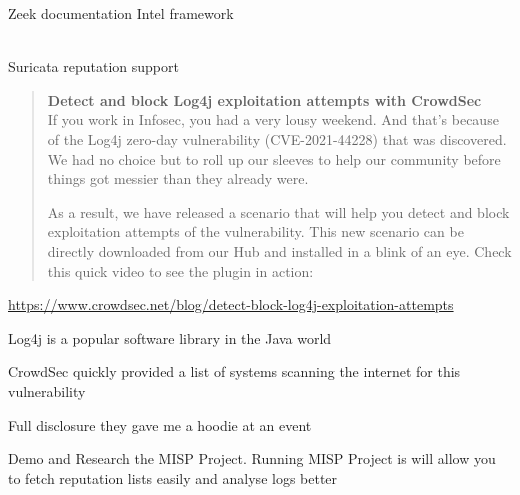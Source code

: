 \documentclass[Screen16to9,17pt]{foils}
\begin{document}

\begin{list1}
\item Zeek documentation Intel framework\\
\\
\item Suricata reputation support\\
\end{list1}





\begin{quote}
{\bf Detect and block Log4j exploitation attempts with CrowdSec}\\
If you work in Infosec, you had a very lousy weekend. And that’s because of the Log4j zero-day vulnerability (CVE-2021-44228) that was discovered. We had no choice but to roll up our sleeves to help our community before things got messier than they already were.

As a result, we have released a scenario that will help you detect and block exploitation attempts of the vulnerability. This new scenario can be directly downloaded from our Hub and installed in a blink of an eye. Check this quick video to see the plugin in action:
\end{quote}

\url{https://www.crowdsec.net/blog/detect-block-log4j-exploitation-attempts}


\begin{list2}
\item Log4j is a popular software library in the Java world
\item CrowdSec quickly provided a list of systems scanning the internet for this vulnerability
\item Full disclosure they gave me a hoodie at an event \smiley
\end{list2}






Demo and Research the MISP Project. Running MISP Project is  will allow you to fetch reputation lists easily and analyse logs better
\end{document}
